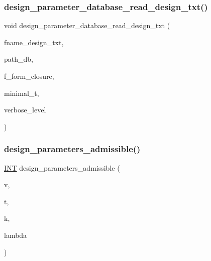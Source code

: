 \subsubsection{\texorpdfstring{design\+\_\+parameter\+\_\+database\+\_\+read\+\_\+design\+\_\+txt()}{design\_parameter\_database\_read\_design\_txt()}}
{\footnotesize\ttfamily void design\+\_\+parameter\+\_\+database\+\_\+read\+\_\+design\+\_\+txt (\begin{DoxyParamCaption}\item[{\mbox{\hyperlink{galois_8h_ab6cc7b4aeb6ea31aba2b3fbfc83ff5e6}{B\+Y\+TE}} $\ast$}]{fname\+\_\+design\+\_\+txt,  }\item[{\mbox{\hyperlink{galois_8h_ab6cc7b4aeb6ea31aba2b3fbfc83ff5e6}{B\+Y\+TE}} $\ast$}]{path\+\_\+db,  }\item[{\mbox{\hyperlink{galois_8h_a09fddde158a3a20bd2dcadb609de11dc}{I\+NT}}}]{f\+\_\+form\+\_\+closure,  }\item[{\mbox{\hyperlink{galois_8h_a09fddde158a3a20bd2dcadb609de11dc}{I\+NT}}}]{minimal\+\_\+t,  }\item[{\mbox{\hyperlink{galois_8h_a09fddde158a3a20bd2dcadb609de11dc}{I\+NT}}}]{verbose\+\_\+level }\end{DoxyParamCaption})}

\mbox{\label{_l_i_b_2_d_i_s_c_r_e_t_a_2design_8_c_a1fdc465f664d8b5b87cf6819dd1e6d11}} 
\subsubsection{\texorpdfstring{design\+\_\+parameters\+\_\+admissible()}{design\_parameters\_admissible()}}
{\footnotesize\ttfamily \mbox{\hyperlink{galois_8h_a09fddde158a3a20bd2dcadb609de11dc}{I\+NT}} design\+\_\+parameters\+\_\+admissible (\begin{DoxyParamCaption}\item[{\mbox{\hyperlink{galois_8h_a09fddde158a3a20bd2dcadb609de11dc}{I\+NT}}}]{v,  }\item[{\mbox{\hyperlink{galois_8h_a09fddde158a3a20bd2dcadb609de11dc}{I\+NT}}}]{t,  }\item[{\mbox{\hyperlink{galois_8h_a09fddde158a3a20bd2dcadb609de11dc}{I\+NT}}}]{k,  }\item[{\mbox{\hyperlink{classdiscreta__base}{discreta\+\_\+base}} \&}]{lambda }\end{DoxyParamCaption})}

